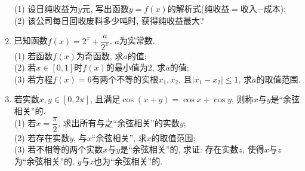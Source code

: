 \documentclass[10pt,a4paper]{article}
\begin{document}
\begin{enumerate}[1.]
(1) 设日纯收益为$y$元, 写出函数$y=f(x)$的解析式(纯收益$=$收入$-$成本);\\
(2) 该公司每日回收废料多少吨时, 获得纯收益最大?
\item 已知函数$f(x)=2^x+\dfrac a{2^x}$, $a$为实常数.\\
(1) 若函数$f(x)$为奇函数, 求$a$的值;\\
(2) 若$x\in [0,1]$时$f(x)$的最小值为$2$, 求$a$的值;\\
(3) 若方程$f(x)=6$有两个不等的实根$x_1,x_2$, 且$|x_1-x_2|\le 1$, 求$a$的取值范围.
\item 若实数$x,y\in [0,2\pi]$, 且满足$\cos (x+y)=\cos x+\cos y$, 则称$x$与$y$是``余弦相关''的.\\
(1) 若$x=\dfrac{\pi}2$, 求出所有与之``余弦相关''的实数$y$;\\
(2) 若存在实数$y$, 与$x$``余弦相关'', 求$x$的取值范围;\\
(3) 若不相等的两个实数$x$与$y$是``余弦相关''的, 求证: 存在实数$z$, 使得$x$与$z$ 为``余弦相关''的, $y$与$z$也为``余弦相关''的.

\end{enumerate}
\end{document}
